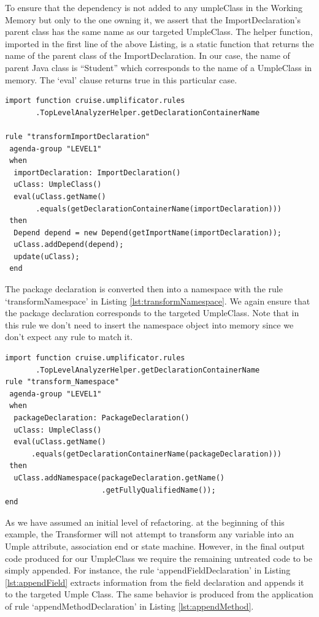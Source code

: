 To ensure that the dependency is not added to any umpleClass in the Working Memory but only to the one owning it, we assert that the ImportDeclaration's parent class has the same name as our targeted UmpleClass. The helper function, imported in the first line of the above Listing, is a static function that returns the name of the parent class of the ImportDeclaration. In our case, the name of parent Java class is ``Student'' which corresponds to the name of a UmpleClass in memory. The `eval' clause returns true in this particular case.

\begin{lstlisting}[language={drools},label={lst:ruleImport}, caption=Rule transformImportDeclaration]
import function cruise.umplificator.rules
       .TopLevelAnalyzerHelper.getDeclarationContainerName
      
rule "transformImportDeclaration"
 agenda-group "LEVEL1" 
 when
  importDeclaration: ImportDeclaration()
  uClass: UmpleClass()
  eval(uClass.getName()
       .equals(getDeclarationContainerName(importDeclaration)))		
 then
  Depend depend = new Depend(getImportName(importDeclaration));
  uClass.addDepend(depend);
  update(uClass);
 end
\end{lstlisting}

The package declaration is converted then into a namespace with the rule `transformNamespace' in Listing \ref{lst:transformNamespace}. We again ensure that the package declaration corresponds to the targeted UmpleClass. Note that in this rule we don't need to insert the namespace object into memory since we don't expect any rule to match it.

\begin{lstlisting}[language={drools},label={lst:transformNamespace}, caption=Rule transformNamespace]
import function cruise.umplificator.rules
       .TopLevelAnalyzerHelper.getDeclarationContainerName
rule "transform_Namespace"
 agenda-group "LEVEL1" 
 when
  packageDeclaration: PackageDeclaration()
  uClass: UmpleClass()
  eval(uClass.getName()
      .equals(getDeclarationContainerName(packageDeclaration)))	
 then
  uClass.addNamespace(packageDeclaration.getName()
                      .getFullyQualifiedName());
end
\end{lstlisting}

As we have assumed an initial level of refactoring. at the beginning of this example, the Transformer will not attempt to transform any variable into an Umple attribute, association end or state machine. However, in the final output code produced for our UmpleClass we require the remaining untreated code to be simply appended. For instance, the rule `appendFieldDeclaration' in Listing \ref{lst:appendField} extracts information from the field declaration and appends it to the targeted Umple Class. The same behavior is produced from the application of rule `appendMethodDeclaration' in Listing \ref{lst:appendMethod}.

